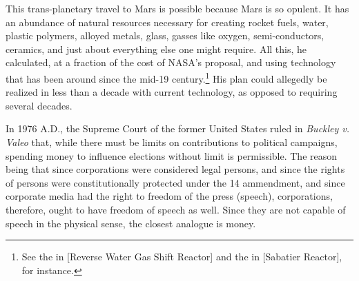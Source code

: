 This trans-planetary travel to Mars is possible because Mars is so opulent. It has an abundance of natural resources necessary for creating rocket fuels, water, plastic polymers, alloyed metals, glass, gasses like oxygen, semi-conductors, ceramics, and just about everything else one might require. All this, he calculated, at a fraction of the cost of NASA's proposal, and using technology that has been around since the mid-19 century.\footnote{See the  in [Reverse Water Gas Shift Reactor] and the  in [Sabatier Reactor], for instance.} His plan could allegedly be realized in less than a decade with current technology, as opposed to requiring several decades.
\stopdefinition

In 1976 A.D., the Supreme Court of the former United States ruled in {\it Buckley v. Valeo} that, while there must be limits on contributions to political campaigns, spending money to influence elections without limit is permissible. The reason being that since corporations were considered legal persons, and since the rights of persons were constitutionally protected under the 14 ammendment, and since corporate media had the right to freedom of the press (speech), corporations, therefore, ought to have freedom of speech as well. Since they are not capable of speech in the physical sense, the closest analogue is money.
\stopdefinition

